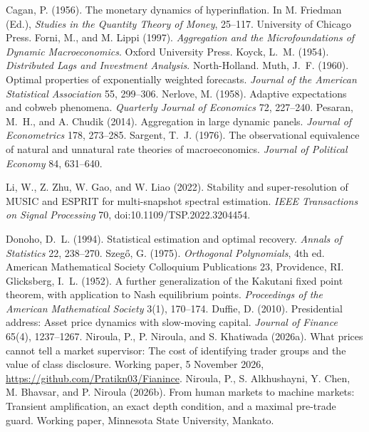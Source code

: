  Cagan, P. (1956). The monetary dynamics of hyperinflation. In M. Friedman (Ed.), \emph{Studies in the Quantity Theory of Money}, 25--117. University of Chicago Press.
 Forni, M., and M. Lippi (1997). \emph{Aggregation and the Microfoundations of Dynamic Macroeconomics}. Oxford University Press.
 Koyck, L.~M. (1954). \emph{Distributed Lags and Investment Analysis}. North-Holland.
 Muth, J.~F. (1960). Optimal properties of exponentially weighted forecasts. \emph{Journal of the American Statistical Association} 55, 299--306.
 Nerlove, M. (1958). Adaptive expectations and cobweb phenomena. \emph{Quarterly Journal of Economics} 72, 227--240.
 Pesaran, M.~H., and A. Chudik (2014). Aggregation in large dynamic panels. \emph{Journal of Econometrics} 178, 273--285.
 Sargent, T.~J. (1976). The observational equivalence of natural and unnatural rate theories of macroeconomics. \emph{Journal of Political Economy} 84, 631--640.

 Li, W., Z. Zhu, W. Gao, and W. Liao (2022). Stability and super-resolution of MUSIC and ESPRIT for multi-snapshot spectral estimation. \emph{IEEE Transactions on Signal Processing} 70, doi:10.1109/TSP.2022.3204454.

 Donoho, D.~L. (1994). Statistical estimation and optimal recovery. \emph{Annals of Statistics} 22, 238--270.
 Szeg\H{o}, G. (1975). \emph{Orthogonal Polynomials}, 4th ed. American Mathematical Society Colloquium Publications 23, Providence, RI.
 Glicksberg, I.~L. (1952). A further generalization of the Kakutani fixed point theorem, with application to Nash equilibrium points. \emph{Proceedings of the American Mathematical Society} 3(1), 170--174.
 Duffie, D. (2010). Presidential address: Asset price dynamics with slow-moving capital. \emph{Journal of Finance} 65(4), 1237--1267.
 Niroula, P., P. Niroula, and S. Khatiwada (2026a). What prices cannot tell a market supervisor: The cost of identifying trader groups and the value of class disclosure. Working paper, 5 November 2026, \url{https://github.com/Pratikn03/Fianince}.
 Niroula, P., S. Alkhushayni, Y. Chen, M. Bhavsar, and P. Niroula (2026b). From human markets to machine markets: Transient amplification, an exact depth condition, and a maximal pre-trade guard. Working paper, Minnesota State University, Mankato.
